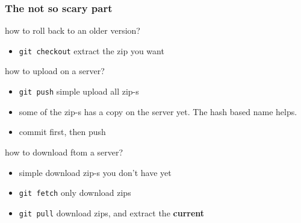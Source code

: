 \documentclass[aspectratio=169]{beamer}
\begin{document}
\begin{frame}
\frametitle<presentation>{The not so scary part}
  
  \begin{block}{how to roll back to an older version?}
	\begin{itemize}
		\item \texttt{git checkout}   extract the zip you want
	\end{itemize}
  \end{block}
  
  \begin{block}{how to upload on a server?}
	\begin{itemize}
		\item \texttt{git push} simple upload all zip-s
		\item some of the zip-s has a copy on the server yet. The hash based name helps.
		\item commit first, then push
	\end{itemize}
  \end{block}

  \begin{block}{how to download ftom a server?}
	\begin{itemize}
		\item simple download zip-s you don't have yet
		\item \texttt{git fetch} only download zips
		\item \texttt{git pull}  download zips, and extract the \textbf{current}
	\end{itemize}
  \end{block}

  
  
\end{frame}
\end{document}
